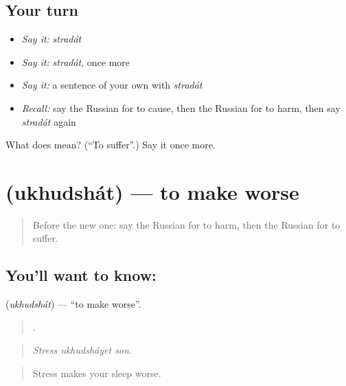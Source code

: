 \subsection*{Your turn}
\begin{itemize}
\raggedright
  \item \emph{Say it:} \emph{stradát}
  \item \emph{Say it:} \emph{stradát}, once more
  \item \emph{Say it:} a sentence of your own with \emph{stradát}
  \item \emph{Recall:} say the Russian for to cause, then the Russian for to harm, then say \emph{stradát} again
\end{itemize}

\begin{tcolorbox}[breakable,colback=teal!4,colframe=teal!35!black,title={Before you move on}]
What does  mean? (\textquotedblleft{}To suffer\textquotedblright{}.) Say it once more.
\end{tcolorbox}
\section[\texorpdfstring{\ru{ухудшать} (ukhudshát)}{ухудшать (ukhudshát)}]{ (ukhudshát) — to make worse}

\label{lesson:RU-C353-ukhudshat}



\begin{quote}
Before the new one: say the Russian for to harm, then the Russian for to suffer.
\end{quote}

\subsection*{You'll want to know: }
\textbf{} (\emph{ukhudshát}) — \textquotedblleft{}to make worse\textquotedblright{}.

\begin{quote}
  .
\end{quote}

\begin{quote}
\emph{Stress ukhudsháyet son.}
\end{quote}

\begin{quote}
Stress makes your sleep worse.
\end{quote}


